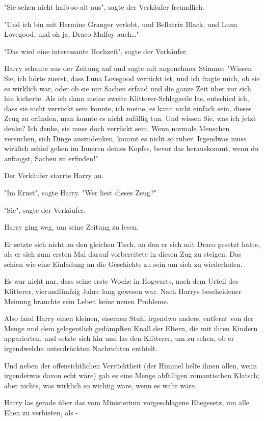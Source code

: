 {"Sie sehen nicht halb so alt aus", sagte der Verkäufer freundlich.

"Und ich bin mit Hermine Granger verlobt, und Bellatrix Black, und Luna Lovegood, und oh ja, Draco Malfoy auch…"

"Das wird eine interessante Hochzeit", sagte der Verkäufer.

Harry schaute aus der Zeitung auf und sagte mit angenehmer Stimme: "Wissen Sie, ich hörte zuerst, dass Luna Lovegood verrückt ist, und ich fragte mich, ob sie es wirklich war, oder ob sie nur Sachen erfand und die ganze Zeit über vor sich hin kicherte. Als ich dann meine zweite Klitterer-Schlagzeile las, entschied ich, dass sie nicht verrückt sein konnte, ich meine, es kann nicht einfach sein, dieses Zeug zu erfinden, man konnte es nicht zufällig tun. Und wissen Sie, was ich jetzt denke? Ich denke, sie muss doch verrückt sein. Wenn normale Menschen versuchen, sich Dinge auszudenken, kommt es nicht so rüber. Irgendwas muss wirklich schief gehen im Inneren deines Kopfes, bevor das herauskommt, wenn du anfängst, Sachen zu erfinden!"

Der Verkäufer starrte Harry an.

"Im Ernst", sagte Harry. "Wer liest dieses Zeug?"

"Sie", sagte der Verkäufer.

Harry ging weg, um seine Zeitung zu lesen.

Er setzte sich nicht an den gleichen Tisch, an den er sich mit Draco gesetzt hatte, als er sich zum ersten Mal darauf vorbereitete in diesen Zug zu steigen. Das schien wie eine Einladung an die Geschichte zu sein um sich zu wiederholen.

Es war nicht nur, dass seine erste Woche in Hogwarts, nach dem Urteil des Klitterer, vierundfünfzig Jahre lang gewesen war. Nach Harrys bescheidener Meinung brauchte sein Leben keine neuen Probleme.

Also fand Harry einen kleinen, eisernen Stuhl irgendwo anders, entfernt von der Menge und dem gelegentlich gedämpften Knall der Eltern, die mit ihren Kindern apparierten, und setzte sich hin und las den Klitterer, um zu sehen, ob er irgendwelche unterdrückten Nachrichten enthielt.

Und neben der offensichtlichen Verrücktheit (der Himmel helfe ihnen allen, wenn irgendetwas davon echt wäre) gab es eine Menge abfälligen romantischen Klatsch; aber nichts, was wirklich so wichtig wäre, wenn es wahr wäre.

Harry las gerade über das vom Ministerium vorgeschlagene Ehegesetz, um alle Ehen zu verbieten, als -

}
